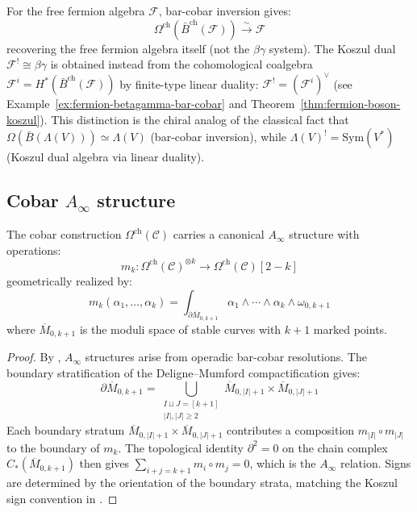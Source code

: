 \begin{example}\label{ex:cobar-bar-fermion}
For the free fermion algebra $\mathcal{F}$, bar-cobar inversion gives:
\[
\Omega^{\text{ch}}(\bar{B}^{\text{ch}}(\mathcal{F})) \xrightarrow{\sim} \mathcal{F}
\]
recovering the free fermion algebra itself (not the $\beta\gamma$
system). The Koszul dual $\mathcal{F}^! \cong \beta\gamma$ is
obtained instead from the cohomological coalgebra
$\mathcal F^i=H^*(\bar{B}^{\text{ch}}(\mathcal{F}))$ by finite-type
linear duality:
$\mathcal{F}^!=(\mathcal F^i)^\vee$
(see Example~\ref{ex:fermion-betagamma-bar-cobar} and
Theorem~\ref{thm:fermion-boson-koszul}). This distinction is the
chiral analog of the classical fact that
$\Omega(\bar{B}({\Lambda}(V))) \simeq {\Lambda}(V)$
(bar-cobar inversion), while
${\Lambda}(V)^! = \mathrm{Sym}(V^*)$ (Koszul dual algebra via
linear duality).
\end{example}


\subsection{\texorpdfstring{Cobar $A_\infty$ structure}{Cobar A-infinity structure}}
\label{subsec:cobar-diff-ainfty}

\begin{theorem}\label{thm:cobar-ainfty}
The cobar construction $\Omega^{\text{ch}}(\mathcal{C})$ carries a canonical $A_\infty$ structure with operations:
\[
m_k: \Omega^{\text{ch}}(\mathcal{C})^{\otimes k} \to \Omega^{\text{ch}}(\mathcal{C})[2-k]
\]
geometrically realized by:
\[
m_k(\alpha_1, \ldots, \alpha_k) = \int_{\partial \overline{M}_{0,k+1}} \alpha_1 \wedge \cdots \wedge \alpha_k \wedge \omega_{0,k+1}
\]
where $\overline{M}_{0,k+1}$ is the moduli space of stable curves with $k+1$ marked points.
\end{theorem}

\begin{proof}
By \cite[Theorem~9.2.8]{LV12}, $A_\infty$ structures arise from operadic bar-cobar resolutions.
The boundary stratification of the Deligne--Mumford compactification gives:
\[
\partial \overline{M}_{0,k+1} = \bigcup_{\substack{I \sqcup J = [k+1] \\ |I|,|J| \geq 2}} \overline{M}_{0,|I|+1} \times \overline{M}_{0,|J|+1}
\]
Each boundary stratum $\overline{M}_{0,|I|+1} \times \overline{M}_{0,|J|+1}$ contributes a composition $m_{|I|} \circ m_{|J|}$ to the boundary of $m_k$. The topological identity $\partial^2 = 0$ on the chain complex $C_*(\overline{M}_{0,k+1})$ then gives $\sum_{i+j=k+1} m_i \circ m_j = 0$, which is the $A_\infty$ relation. Signs are determined by the orientation of the boundary strata, matching the Koszul sign convention in \cite[\S10.3]{LV12}.
\end{proof}

